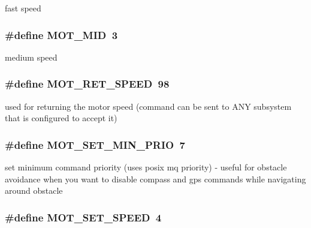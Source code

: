 fast speed \hypertarget{group__motor__commands_ga90a66dc37a63d7ff939b606b1d5ba87c}{
\subsubsection[{M\-O\-T\-\_\-\-M\-I\-D}]{\setlength{\rightskip}{0pt plus 5cm}\#define M\-O\-T\-\_\-\-M\-I\-D~3}}\label{group__motor__commands_ga90a66dc37a63d7ff939b606b1d5ba87c}
medium speed \hypertarget{group__motor__commands_ga931465aec3d487ebea5d34e80f940b8c}{
\subsubsection[{M\-O\-T\-\_\-\-R\-E\-T\-\_\-\-S\-P\-E\-E\-D}]{\setlength{\rightskip}{0pt plus 5cm}\#define M\-O\-T\-\_\-\-R\-E\-T\-\_\-\-S\-P\-E\-E\-D~98}}\label{group__motor__commands_ga931465aec3d487ebea5d34e80f940b8c}
used for returning the motor speed (command can be sent to A\-N\-Y subsystem that is configured to accept it) \hypertarget{group__motor__commands_ga0c48e1fea8fe34438ee9e9b2e101d1de}{
\subsubsection[{M\-O\-T\-\_\-\-S\-E\-T\-\_\-\-M\-I\-N\-\_\-\-P\-R\-I\-O}]{\setlength{\rightskip}{0pt plus 5cm}\#define M\-O\-T\-\_\-\-S\-E\-T\-\_\-\-M\-I\-N\-\_\-\-P\-R\-I\-O~7}}\label{group__motor__commands_ga0c48e1fea8fe34438ee9e9b2e101d1de}
set minimum command priority (uses posix mq priority) -\/ useful for obstacle avoidance when you want to disable compass and gps commands while navigating around obstacle \hypertarget{group__motor__commands_ga318320d9d310be3e25a20f55ccbda7a6}{
\subsubsection[{M\-O\-T\-\_\-\-S\-E\-T\-\_\-\-S\-P\-E\-E\-D}]{\setlength{\rightskip}{0pt plus 5cm}\#define M\-O\-T\-\_\-\-S\-E\-T\-\_\-\-S\-P\-E\-E\-D~4}}\label{group__motor__commands_ga318320d9d310be3e25a20f55ccbda7a6}
